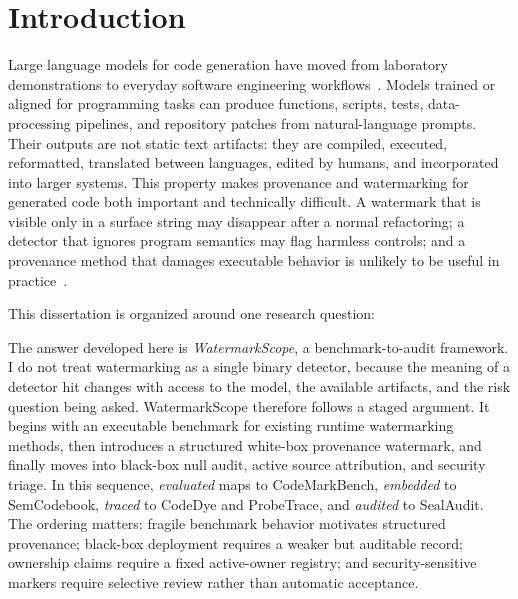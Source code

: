 \chapter{Introduction}\label{cpt:intro}

Large language models for code generation have moved from laboratory demonstrations to everyday software engineering workflows~\cite{chen2021codex,roziere2023codellama}. Models trained or aligned for programming tasks can produce functions, scripts, tests, data-processing pipelines, and repository patches from natural-language prompts. Their outputs are not static text artifacts: they are compiled, executed, reformatted, translated between languages, edited by humans, and incorporated into larger systems. This property makes provenance and watermarking for generated code both important and technically difficult. A watermark that is visible only in a surface string may disappear after a normal refactoring; a detector that ignores program semantics may flag harmless controls; and a provenance method that damages executable behavior is unlikely to be useful in practice~\cite{kirchenbauer2023watermark,li2023protecting,lee2024who}.

This dissertation is organized around one research question:


The answer developed here is \emph{WatermarkScope}, a benchmark-to-audit framework. I do not treat watermarking as a single binary detector, because the meaning of a detector hit changes with access to the model, the available artifacts, and the risk question being asked. WatermarkScope therefore follows a staged argument. It begins with an executable benchmark for existing runtime watermarking methods, then introduces a structured white-box provenance watermark, and finally moves into black-box null audit, active source attribution, and security triage. In this sequence, \emph{evaluated} maps to CodeMarkBench, \emph{embedded} to SemCodebook, \emph{traced} to CodeDye and ProbeTrace, and \emph{audited} to SealAudit. The ordering matters: fragile benchmark behavior motivates structured provenance; black-box deployment requires a weaker but auditable record; ownership claims require a fixed active-owner registry; and security-sensitive markers require selective review rather than automatic acceptance.

